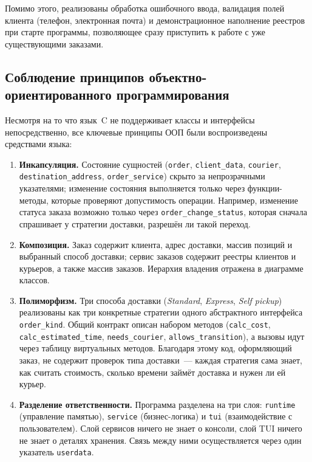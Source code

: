 \documentclass[12pt]{extarticle}
\newcommand{\cmd}[1]{\texttt{#1}}
\begin{document}
Помимо этого, реализованы обработка ошибочного ввода, валидация
полей клиента (телефон, электронная почта) и демонстрационное
наполнение реестров при старте программы, позволяющее сразу
приступить к работе с уже существующими заказами.

\subsection*{Соблюдение принципов объектно-ориентированного
программирования}

Несмотря на то что язык~C не поддерживает классы и интерфейсы
непосредственно, все ключевые принципы ООП были воспроизведены
средствами языка:

\begin{enumerate}
    \item \textbf{Инкапсуляция.} Состояние сущностей (\cmd{order},
          \cmd{client\_data}, \cmd{courier},
          \cmd{destination\_address}, \cmd{order\_service}) скрыто
          за непрозрачными указателями; изменение состояния
          выполняется только через функции-методы, которые проверяют
          допустимость операции. Например, изменение статуса заказа
          возможно только через \cmd{order\_change\_status},
          которая сначала спрашивает у стратегии доставки, разрешён
          ли такой переход.

    \item \textbf{Композиция.} Заказ содержит клиента, адрес
          доставки, массив позиций и выбранный способ доставки;
          сервис заказов содержит реестры клиентов и курьеров, а
          также массив заказов. Иерархия владения отражена в
          диаграмме классов.

    \item \textbf{Полиморфизм.} Три способа доставки
          (\emph{Standard}, \emph{Express}, \emph{Self pickup})
          реализованы как три конкретные стратегии одного
          абстрактного интерфейса \cmd{order\_kind}. Общий контракт
          описан набором методов (\cmd{calc\_cost},
          \cmd{calc\_estimated\_time}, \cmd{needs\_courier},
          \cmd{allows\_transition}), а вызовы идут через таблицу
          виртуальных методов. Благодаря этому код, оформляющий
          заказ, не содержит проверок типа доставки~--- каждая
          стратегия сама знает, как считать стоимость, сколько
          времени займёт доставка и нужен ли ей курьер.

    \item \textbf{Разделение ответственности.} Программа разделена
          на три слоя: \cmd{runtime} (управление памятью),
          \cmd{service} (бизнес-логика) и \cmd{tui}
          (взаимодействие с пользователем). Слой сервисов ничего
          не знает о консоли, слой TUI ничего не знает о деталях
          хранения. Связь между ними осуществляется через один
          указатель \cmd{userdata}.
\end{enumerate}
\end{document}
